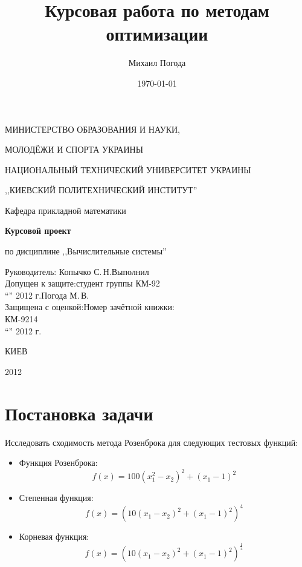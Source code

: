 \documentclass[a4paper,12pt,notitlepage,pdftex,headsepline]{scrartcl}
\author{Михаил Погода}
\title{Курсовая работа по методам оптимизации}
\date{\today}
\begin{document}
  \thispagestyle{empty}
  \begin{center}
    \large
    \MakeUppercase{Министерство образования и науки,}

    \MakeUppercase{молодёжи и спорта Украины}

    \MakeUppercase{Национальный технический университет Украины}

    \MakeUppercase{,,Киевский политехнический институт''}

    \addvspace{6pt}

    \normalsize
    Кафедра прикладной математики

    \vfill

    \textbf{Курсовой проект}

    по дисциплине ,,Вычислительные системы''
  \end{center}

  \vfill

  Руководитель: Копычко С.\,Н.\hfill Выполнил\\
  Допущен к защите:\hfill студент группы КМ-92\\
  ``\underline{\hspace{0.5cm}}'' \underline{\hspace{5cm}} 2012 г.\hfill Погода
  М.\,В.\\
  Защищена с оценкой:\hfill Номер зачётной книжки:\\
  \underline{\hspace{7cm}} \hfill КМ-9214\\
  ``\underline{\hspace{0.6cm}}'' \underline{\hspace{5cm}} 2012 г.

  \vfill

  \begin{center}
    КИЕВ

    2012
  \end{center}
  \clearpage
  \tableofcontents
  \clearpage

\section{Постановка задачи}
  Исследовать сходимость метода Розенброка для следующих тестовых функций:
  \begin{itemize}
    \item Функция Розенброка:
      \[
        f\left(x\right) = 100 \left(x_1^2 - x_2\right)^2 + \left(x_1 - 1\right)^2
      \]
    \item Степенная функция:
      \[
        f\left(x\right) = \left(10 \left(x_1 - x_2\right)^2 + \left(x_1 - 1
        \right)^2 \right)^4
      \]
    \item Корневая функция:
      \[
        f\left(x\right) = \left(10 \left(x_1 - x_2\right)^2 + \left(x_1 - 1
        \right)^2 \right)^\frac{1}{4}
      \]
  \end{itemize}
\end{document}
